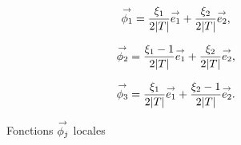     \begin{figure}[!htb]
      \begin{minipage}{0.329\textwidth}
          \begin{center}
            \begin{tikzpicture}[scale=1]
              
            \end{tikzpicture}
          \end{center}
          \begin{equation*}
            \vect{\phi_1}=\frac{\xi_1}{2|T|}\vect{e_1} + \frac{\xi_2}{{2|T|}}\vect{e_2},
          \end{equation*}
      \end{minipage}
      \begin{minipage}{0.329\textwidth}
          \begin{center}
            \begin{tikzpicture}[scale=1]
              
            \end{tikzpicture}
             \begin{equation*}
              \vect{\phi_2}=\frac{\xi_1-1}{2|T|}\vect{e_1} + \frac{\xi_2}{2|T|}\vect{e_2},
            \end{equation*}
          \end{center}
      \end{minipage}
      \begin{minipage}{0.329\textwidth}
          \begin{center}
            \begin{tikzpicture}[scale=1]
              
            \end{tikzpicture}
            \begin{equation*}
              \vect{\phi_3}=\frac{\xi_1}{2|T|}\vect{e_1} + \frac{\xi_2-1}{2|T|}\vect{e_2}.
            \end{equation*}
          \end{center}
      \end{minipage}
      \caption[Fonctions de Raviart-Thomas]{Fonctions \(\phij\) locales}
      \label{fig:form_int:fon_base:phi}
    \end{figure}

